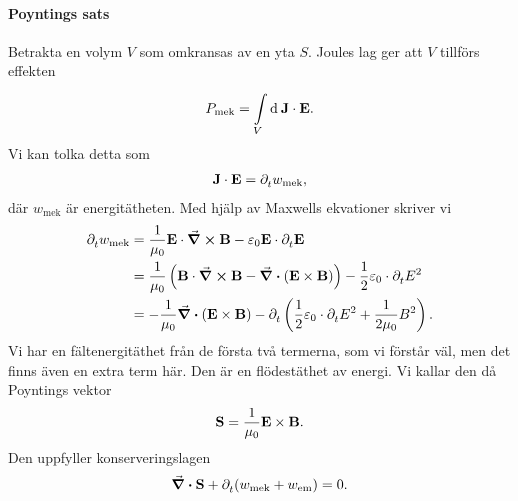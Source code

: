 \paragraph{Poyntings sats}
Betrakta en volym $V$ som omkransas av en yta $S$. Joules lag ger att $V$ tillförs effekten
\begin{align*}
	P_{\text{mek}} = \int\limits_{V}^{}\dd[]{}\vb{J}\cdot\vb{E}.
\end{align*}
Vi kan tolka detta som
\begin{align*}
	\vb{J}\cdot\vb{E} = \partial_{t}^{}w_{\text{mek}},
\end{align*}
där $w_{\text{mek}}$ är energitätheten. Med hjälp av Maxwells ekvationer skriver vi
\begin{align*}
	\partial_{t}^{}w_{\text{mek}} &= \frac{1}{\mu_{0}}\vb{E}\cdot\curl{\vb{B}} - \varepsilon_{0}\vb{E}\cdot\partial_{t}^{}\vb{E} \\
	                        &= \frac{1}{\mu_{0}}\left(\vb{B}\cdot\curl{\vb{B}} - \div(\vb{E}\times\vb{B})\right) - \frac{1}{2}\varepsilon_{0}\cdot\partial_{t}^{}E^{2} \\
	                        &= -\frac{1}{\mu_{0}}\div(\vb{E}\times\vb{B}) - \partial_{t}^{}\left(\frac{1}{2}\varepsilon_{0}\cdot\partial_{t}^{}E^{2} + \frac{1}{2\mu_{0}}B^{2}\right).
\end{align*}
Vi har en fältenergitäthet från de första två termerna, som vi förstår väl, men det finns även en extra term här. Den är en flödestäthet av energi. Vi kallar den då Poyntings vektor
\begin{align*}
	\vb{S} = \frac{1}{\mu_{0}}\vb{E}\times\vb{B}.
\end{align*}
Den uppfyller konserveringslagen
\begin{align*}
	\div{\vb{S}} + \partial_{t}^{}(w_{\text{mek}} + w_{\text{em}}) = 0.
\end{align*}

